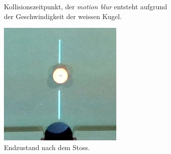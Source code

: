 \begin{figure}[h!]
\begin{subfigure}[t]{0.2\textwidth}
        \caption{Kollisionszeitpunkt, der \emph{motion blur} entsteht aufgrund der Geschwindigkeit der weissen Kugel.}
        \label{fig:simulation_vs_reality_1_0008_0011_collision}
    \end{subfigure}
    \hfill
    \begin{subfigure}[t]{0.2\textwidth}
        \centering
        \includegraphics[width=1.0\linewidth]{../common/04_results/resources/simulation_vs_reality/simulation_vs_reality_1_0008_0011_end_cut.jpg}
        \caption{Endzustand nach dem Stoss.}
        \label{fig:simulation_vs_reality_1_0008_0011_end}
    \end{subfigure}
    \hfill
    \begin{subfigure}[t]{0.2\textwidth}
        \centering

\end{subfigure}
\end{figure}

